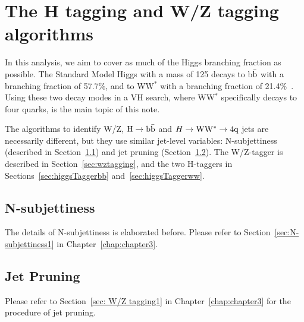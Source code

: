 \section{The H tagging and W/Z tagging algorithms}
\label{sec: H tagging}

In this
analysis, we aim to cover as much of the Higgs branching fraction as
possible.  The Standard Model Higgs with a mass of 125 \GeVcc decays
to b$\bar{\rm b}$ with a branching fraction of 57.7\%, and to WW$^*$
with a branching fraction of 21.4\%~\cite{pdg-higgs}.  Using these two
decay modes in a VH search, where WW$^*$ specifically decays to four
quarks, is the main topic of this note. 



The algorithms to identify W/Z, ${\rm H \to b\bar{b}}$ and 
$H\to{\rm W}{\rm W}^*\to4{\rm q}$ jets are necessarily different, but they use similar
jet-level variables: N-subjettiness (described in
Section~\ref{sec:N-subjettiness}) and jet pruning
(Section~\ref{sec:jetPruning}).  The W/Z-tagger is described in
Section~\ref{sec:wztagging}, and the two H-taggers in
Sections~\ref{sec:higgsTaggerbb} and~\ref{sec:higgsTaggerww}.



\subsection{N-subjettiness}
\label{sec:N-subjettiness}

The details of N-subjettiness is elaborated before. Please refer to 
Section~\ref{sec:N-subjettiness1} in Chapter~\ref{chap:chapter3}. 



\subsection{Jet Pruning}
\label{sec:jetPruning}

Please refer to Section~\ref{sec: W/Z tagging1} in 
Chapter~\ref{chap:chapter3} for the procedure of jet pruning. 

